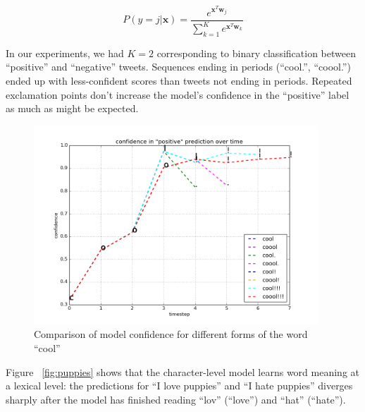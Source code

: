 \documentclass{article} %
\begin{document}
$$P(y = j|\mathbf{x}) = \frac{e^{\mathbf{x}^T \mathbf{w}_j}}{\sum_{k=1}^{K} e^{\mathbf{x}^T \mathbf{w}_k}}$$

In our experiments, we had $K = 2$ corresponding to binary classification between ``positive'' and ``negative'' tweets. Sequences ending in periods (``cool.'', ``coool.'') ended up with less-confident scores than tweets not ending in periods. Repeated exclamation points don't increase the model's confidence in the ``positive'' label as much as might be expected. 

\begin{figure}[h!]
\label{fig:cool}
\begin{center}
\includegraphics[width=0.95\textwidth]{figs/cool}
\end{center}
\caption{Comparison of model confidence for different forms of the word ``cool''}
\end{figure}

Figure ~\ref{fig:puppies} shows that the character-level model learns word meaning at a lexical level: the predictions for ``I love puppies'' and ``I hate puppies'' diverges sharply after the model has finished reading ``lov'' (``love'') and ``hat'' (``hate'').
\end{document}
